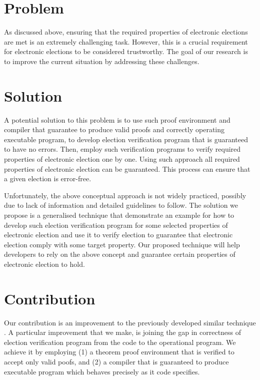 \section{Problem} 
As discussed above, ensuring that the required properties of electronic elections are met is an 
extremely challenging task. However, this is a crucial requirement for electronic elections to be 
considered trustworthy. The goal of our research is to improve the current situation by addressing 
these challenges.
\section{Solution}
A potential solution to this problem is to use such proof environment and compiler that guarantee 
to produce valid proofs and correctly operating executable program, to develop election verification 
program that is guaranteed to have no errors. Then, employ such verification programs to verify required properties of electronic election one by one. Using such approach all required properties of electronic election can be guaranteed. This process can ensure that a given election is error-free.

Unfortunately, the above conceptual approach is not widely practiced, possibly due to lack of 
information and detailed guidelines to follow. The solution we propose is a generalised 
technique that demonstrate an example for how to develop such  election verification program 
for some selected properties of electronic election and use it to verify election to guarantee that electronic election comply with some target property. Our proposed technique will help developers to rely on the above concept and guarantee certain properties of electronic election to hold.
\section{Contribution}
Our contribution is an improvement to the previously developed similar 
technique \cite{Haines2019VerifiableHT}. A particular improvement that we make, 
is joining the gap in correctness of election verification program from the code 
to the operational program. We achieve it by employing (1) a theorem proof environment 
that is verified to accept only valid poofs, and (2) a compiler that is guaranteed to 
produce executable program which behaves precisely as it code specifies. 
